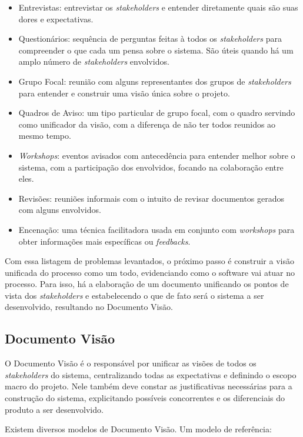 \begin{itemize}
    \item Entrevistas: entrevistar os \textit{stakeholders} e entender diretamente quais são suas dores e expectativas.
    \item Questionários: sequência de perguntas feitas à todos os \textit{stakeholders} para compreender o que cada um pensa sobre o sistema. São úteis quando há um amplo número de \textit{stakeholders} envolvidos.
    \item Grupo Focal: reunião com alguns representantes dos grupos de \textit{stakeholders} para entender e construir uma visão única sobre o projeto.
    \item Quadros de Aviso: um tipo particular de grupo focal, com o quadro servindo como unificador da visão, com a diferença de não ter todos reunidos ao mesmo tempo.
    \item \textit{Workshops}: eventos avisados com antecedência para entender melhor sobre o sistema, com a participação dos envolvidos, focando na colaboração entre eles.
    \item Revisões: reuniões informais com o intuito de revisar documentos gerados com alguns envolvidos.
    \item Encenação: uma técnica facilitadora usada em conjunto com \textit{workshops} para obter informações mais específicas ou \textit{feedbacks}.
\end{itemize}

Com essa listagem de problemas levantados, o próximo passo é construir a visão unificada do processo como um todo, evidenciando como o software vai atuar no processo. Para isso, há a elaboração de um documento unificando os pontos de vista dos \textit{stakeholders} e estabelecendo o que de fato será o sistema a ser desenvolvido, resultando no Documento Visão.

\subsection{Documento Visão}
O Documento Visão é o responsável por unificar as visões de todos os \textit{stakeholders} do sistema, centralizando todas as expectativas e definindo o escopo macro do projeto. Nele também deve constar as justificativas necessárias para a construção do sistema, explicitando possíveis concorrentes e os diferenciais do produto a ser desenvolvido.

Existem diversos modelos de Documento Visão. Um modelo de referência\cite[cap. ~3, p. ~135-136]{kurtbittnerianspence2002}:

